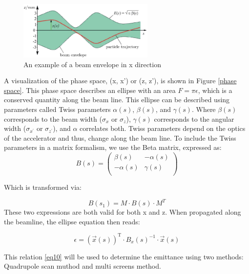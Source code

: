 \documentclass[12pt]{article}
\begin{document}
\begin{figure}[H]
    \centering
    \includegraphics[width = 0.6\textwidth]{fig/beam envelope.jpg}
    \caption{An example of a beam envelope in x direction}
    \label{beam envelope}
\end{figure}

A visualization of the phase space, (x, x') or (z, z'), is shown in Figure \ref{phase space}. This phase space describes an ellipse with an area $F = \pi \epsilon$, which is a conserved quantity along the beam line. This ellipse can be described using parameters called Twiss parameters $\alpha (s)$, $ \beta (s)$, and $\gamma (s)$. Where $\beta (s)$ corresponds to the beam width ($\sigma_x$ or $\sigma_z$), $\gamma (s)$ corresponds to the angular width ($\sigma_{x^{'}}$ or $\sigma_{z^{'}}$), and $\alpha$ correlates both. Twiss parameters depend on the optics of the accelerator and thus, change along the beam line. To include the Twiss parameters in a matrix formalism, we use the Beta matrix, expressed as:
\begin{equation}
B (s) = 
    \begin{pmatrix}
    \beta (s) & -\alpha (s)  \\
    -\alpha (s) & \gamma (s)  \\
    
\end{pmatrix}
\label{beta matrix}
\end{equation}

Which is transformed via:

\begin{equation}
 B (s_1) = M \cdot B(s) \cdot M^T 
 \label{eq9}
\end{equation}
These two expressions are both valid for both x and z. When propagated along the beamline, the ellipse equation then reads:

\begin{equation}
\epsilon=(\vec{x}(s))^{\mathrm{T}} \cdot B_x(s)^{-1} \cdot \vec{x}(s)
\label{eq10}
\end{equation}

This relation \ref{eq10} will be used to determine the emittance using two methods: Quadrupole scan muthod and multi screens method. 
\end{document}
